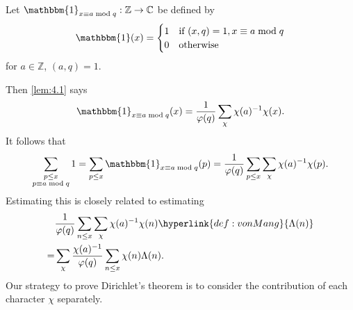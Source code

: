 \documentclass{article}
\newcommand{\1}{\mathbbm{1}}
\begin{document}
\begin{defi}
  Let $\1_{x \equiv a \bmod{q}}:\mathbb{Z}\to\mathbb{C}$ be defined by
  \begin{equation*}
    \1(x) =
    \begin{cases}
      1 & \text{if } (x,q)=1, x \equiv a \bmod{q} \\
      0 & \text{otherwise}
    \end{cases}
  \end{equation*}
  for $a \in \mathbb{Z}$, $(a,q) = 1$.
\end{defi}
Then \cref{lem:4.1} says
\begin{align*}
  \1_{x \equiv a \bmod{q}}(x) = \frac{1}{\varphi(q)} \sum_\chi \chi(a)^{-1} \chi(x).
\end{align*}
It follows that
\begin{align*}
  \sum_{\substack{p \leq x \\ p \equiv a \bmod{q}}} 1 = \sum_{p \leq x} \1_{x \equiv a \bmod{q}}(p) = \frac{1}{\varphi(q)} \sum_{p \leq x} \sum_{\chi} \chi(a)^{-1} \chi(p).
\end{align*}
Estimating this is closely related to estimating
\begin{align*}
  &\frac{1}{\varphi(q)} \sum_{n \leq x} \sum_\chi \chi(a)^{-1} \chi(n) \hyperlink{def:vonMang}{\Lambda(n)} \\
  =&\sum_\chi \frac{\chi(a)^{-1}}{\varphi(q)} \sum_{n \leq x} \chi(n) \Lambda(n).
\end{align*}
Our strategy to prove Dirichlet's theorem is to consider the contribution of each character $\chi$ separately.
\end{document}
